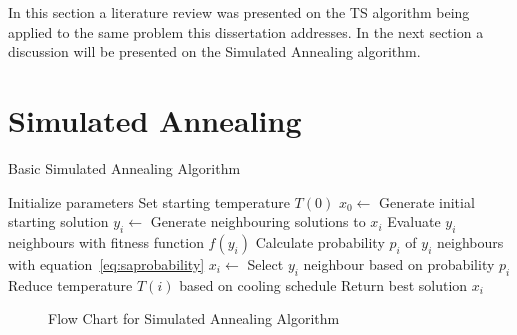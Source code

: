 In this section a literature review was presented on the TS algorithm being applied to the same problem this dissertation addresses. In the next section a discussion will be presented on the Simulated Annealing algorithm.
\section{Simulated Annealing}
\label{sec:simulatedannealing}
\begin{algorithm}
\caption{Basic Simulated Annealing Algorithm\cite{VeryFastSAImageEnchancement,ChaosSA}}
\label{alg:SA}
	\begin{algorithmic}[1]
		\STATE Initialize parameters
		\STATE Set starting temperature $T(0)$
		\STATE $x_0 \leftarrow$ Generate initial starting solution
			\STATE $y_i \leftarrow$ Generate neighbouring solutions to $x_i$
			\STATE Evaluate $y_i$ neighbours with fitness function $f(y_i)$
			\STATE Calculate probability $p_i$ of $y_i$ neighbours with equation~\ref{eq:saprobability}
			\STATE $x_i \leftarrow$ Select $y_i$ neighbour based on probability $p_i$
			\STATE Reduce temperature $T(i)$ based on cooling schedule
		\ENDWHILE
		\STATE Return best solution $x_i$
	\end{algorithmic}
\end{algorithm}
\begin{figure}[htbp!]
	\begin{center}
	\caption{Flow Chart for Simulated Annealing Algorithm}
	\label{fig:SimulatedAnnealingFlowChart}
	\end{center}
\end{figure}
